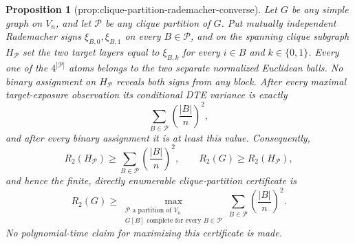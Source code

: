 \documentclass{article}
\newtheorem{proposition}{Proposition}
\begin{document}
\begin{proposition}[prop:clique-partition-rademacher-converse]\label{prop:clique-partition-rademacher-converse}
Let \(G\) be any simple graph on \(V_n\), and let \(\mathcal P\) be any clique partition of \(G\). Put mutually independent Rademacher signs \(\xi_{B,0},\xi_{B,1}\) on every \(B\in\mathcal P\), and on the spanning clique subgraph \(H_{\mathcal P}\) set the two target layers equal to \(\xi_{B,k}\) for every \(i\in B\) and \(k\in\{0,1\}\). Every one of the \(4^{|\mathcal P|}\) atoms belongs to the two separate normalized Euclidean balls. No binary assignment on \(H_{\mathcal P}\) reveals both signs from any block. After every maximal target-exposure observation its conditional DTE variance is exactly
\[
\sum_{B\in\mathcal P}\left(\frac{|B|}{n}\right)^2,
\]
and after every binary assignment it is at least this value. Consequently,
\[
R_2(H_{\mathcal P})\geq
\sum_{B\in\mathcal P}\left(\frac{|B|}{n}\right)^2,
\qquad
R_2(G)\geq R_2(H_{\mathcal P}),
\]
and hence the finite, directly enumerable clique-partition certificate is
\[
R_2(G)\geq
\max_{\substack{\mathcal P\text{ a partition of }V_n\\
G[B]\text{ complete for every }B\in\mathcal P}}
\sum_{B\in\mathcal P}\left(\frac{|B|}{n}\right)^2.
\]
No polynomial-time claim for maximizing this certificate is made.
\end{proposition}
\end{document}
